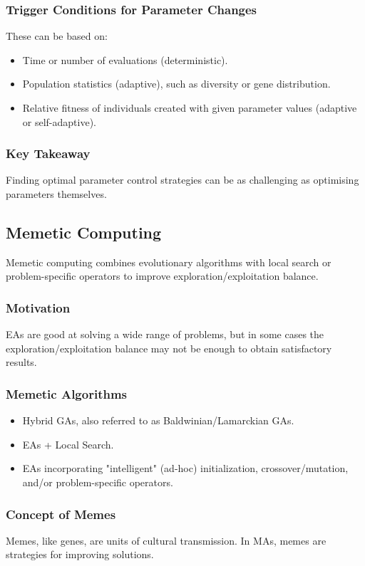 \subsubsection*{Trigger Conditions for Parameter Changes}
These can be based on:
\begin{itemize}
    \item Time or number of evaluations (deterministic).
    \item Population statistics (adaptive), such as diversity or gene distribution.
    \item Relative fitness of individuals created with given parameter values (adaptive or self-adaptive).
\end{itemize}
\subsubsection*{Key Takeaway}
Finding optimal parameter control strategies can be as challenging as optimising parameters themselves.

\subsection*{Memetic Computing}
Memetic computing combines evolutionary algorithms with local search or problem-specific operators to improve exploration/exploitation balance.
\subsubsection*{Motivation}
EAs are good at solving a wide range of problems, but in some cases the exploration/exploitation balance may not be enough to obtain satisfactory results.
\subsubsection*{Memetic Algorithms}
\begin{itemize}
    \item  Hybrid GAs, also referred to as Baldwinian/Lamarckian GAs.
    \item EAs + Local Search.
    \item  EAs incorporating "intelligent" (ad-hoc) initialization, crossover/mutation, and/or problem-specific operators.
\end{itemize}
\subsubsection*{Concept of Memes}
Memes, like genes, are units of cultural transmission. In MAs, memes are strategies for improving solutions.
